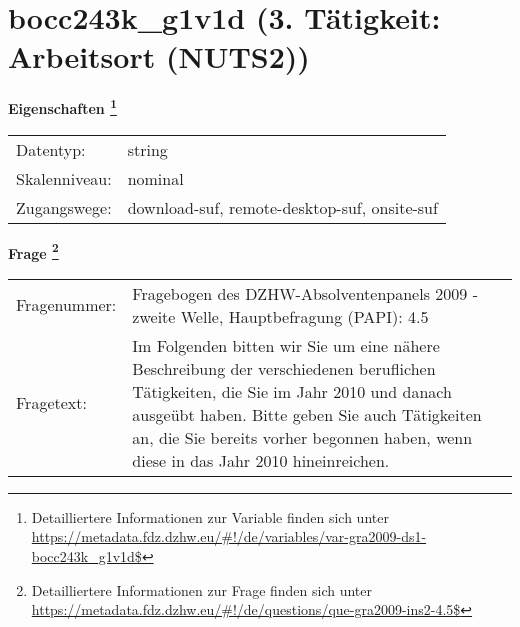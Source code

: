 
    \setcounter{footnote}{0}

    \vspace*{-1.8cm}
	\section{bocc243k\_g1v1d (3. Tätigkeit: Arbeitsort (NUTS2))}
	\label{section:bocc243k_g1v1d}



    \vspace*{0.5cm}
    \noindent\textbf{Eigenschaften
	\footnote{Detailliertere Informationen zur Variable finden sich unter
		\url{https://metadata.fdz.dzhw.eu/\#!/de/variables/var-gra2009-ds1-bocc243k_g1v1d$}}}\\
	\begin{tabularx}{\hsize}{@{}lX}
	Datentyp: & string \\
	Skalenniveau: & nominal \\
	Zugangswege: &
	  download-suf, 
	  remote-desktop-suf, 
	  onsite-suf
 \\
    \end{tabularx}



				\vspace*{0.5cm}
                \noindent\textbf{Frage
	                \footnote{Detailliertere Informationen zur Frage finden sich unter
		              \url{https://metadata.fdz.dzhw.eu/\#!/de/questions/que-gra2009-ins2-4.5$}}}\\
				\begin{tabularx}{\hsize}{@{}lX}
					Fragenummer: &
					  Fragebogen des DZHW-Absolventenpanels 2009 - zweite Welle, Hauptbefragung (PAPI):
					  4.5
 \\
					Fragetext: & Im Folgenden bitten wir Sie um eine nähere Beschreibung der verschiedenen beruflichen Tätigkeiten, die Sie im Jahr 2010 und danach ausgeübt haben. Bitte geben Sie auch Tätigkeiten an, die Sie bereits vorher begonnen haben, wenn diese in das Jahr 2010 hineinreichen. \\
				\end{tabularx}





